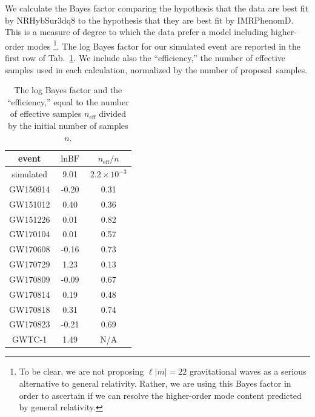 \documentclass[prd,superscriptaddress,twocolumn,nopreprintnumbers,floatfix,longbibliography]{revtex4}
\newcommand{\sur}{{\sc NRHybSur3dq8}\xspace}
\newcommand{\proposal}{proposal}
\begin{document}
We calculate the Bayes factor comparing the hypothesis that the data are best fit by \sur to the hypothesis that they are best fit by {\sc IMRPhenomD}.
This is a measure of degree to which the data prefer a model including higher-order modes \footnote{To be clear, we are not proposing $\ell|m|=22$ gravitational waves as a serious alternative to general relativity. Rather, we are using this Bayes factor in order to ascertain if we can resolve the higher-order mode content predicted by general relativity.}.
The log Bayes factor for our simulated event are reported in the first row of Tab.~\ref{tab:BF}.
We include also the ``efficiency,'' the number of effective samples used in each calculation, normalized by the number of \proposal\ samples.

\begin{center}
    \begin{table}
        \begin{tabular}{ |c|c|c| } 
            \hline
            event & $\ln\text{BF}$ & $n_\text{eff}/n$ \\\hline
            simulated & 9.01 & $2.2\times10^{-3}$\\\hline
            GW150914 & -0.20 & 0.31\\
            GW151012 & 0.40 & 0.36 \\
            GW151226 & 0.01 &  0.82\\
            GW170104 & 0.01 & 0.57 \\
            GW170608 & -0.16 & 0.73\\
            GW170729 & 1.23 & 0.13\\
            GW170809 & -0.09 & 0.67\\
            GW170814 & 0.19 & 0.48\\
            GW170818 & 0.31 & 0.74 \\
            GW170823 & -0.21 & 0.69 \\\hline
            GWTC-1 & 1.49 & N/A\\\hline
        \end{tabular}
        \caption{
            The log Bayes factor and the ``efficiency,''  equal to the number of effective samples $n_\text{eff}$ divided by the initial number of samples $n$.
        }
        \label{tab:BF}
    \end{table}
\end{center}
\end{document}
